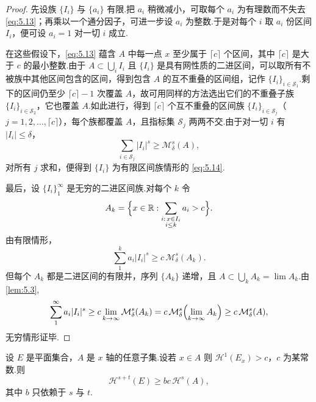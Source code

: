 \begin{proof}
先设族 $\{I_i\}$ 与 $\{a_i\}$ 有限.把 $a_i$ 稍微减小，可取每个 $a_i$ 为有理数而不失去 \eqref{eq:5.13}；再乘以一个通分因子，可进一步设 $a_i$ 为整数.于是对每个 $i$ 取 $a_i$ 份区间 $I_i$，便可设 $a_i=1$ 对一切 $i$ 成立.

在这些假设下，\eqref{eq:5.13} 蕴含 $A$ 中每一点 $x$ 至少属于 $\lceil c\rceil$ 个区间，其中 $\lceil c\rceil$ 是大于 $c$ 的最小整数.由于 $A\subset\bigcup_i I_i$ 且 $\{I_i\}$ 是具有网性质的二进区间，可以取所有不被族中其他区间包含的区间，得到包含 $A$ 的互不重叠的区间组，记作 $\{I_i\}_{i\in\mathcal{S}_1}$.剩下的区间仍至少 $\lceil c\rceil-1$ 次覆盖 $A$，故可用同样的方法选出它们的不重叠子族 $\{I_i\}_{i\in\mathcal{S}_2}$，它也覆盖 $A$.如此进行，得到 $\lceil c\rceil$ 个互不重叠的区间族 $\{I_i\}_{i\in\mathcal{S}_j}$（$j=1,2,\ldots,\lceil c\rceil$），每个族都覆盖 $A$，且指标集 $\mathcal{S}_j$ 两两不交.由于对一切 $i$ 有 $|I_i|\leq\delta$，
\[
  \sum_{i\in\mathcal{S}_j}|I_i|^{s}\geq\mathcal{M}^{s}_{\delta}(A),
\]
对所有 $j$ 求和，便得到 $\{I_i\}$ 为有限区间族情形的 \eqref{eq:5.14}.

最后，设 $\{I_i\}_{1}^{\infty}$ 是无穷的二进区间族.对每个 $k$ 令
\[
  A_k=\Bigl\{x\in\mathbb{R}:\sum_{\substack{i:\,x\in I_i\\ i\leq k}}a_i>c\Bigr\}.
\]
由有限情形，
\[
  \sum_{1}^{k}a_i|I_i|^{s}\geq c\,\mathcal{M}^{s}_{\delta}(A_k).
\]
但每个 $A_k$ 都是二进区间的有限并，序列 $\{A_k\}$ 递增，且 $A\subset\bigcup_k A_k=\lim A_k$.由\cref{lem:5.3},
\[
  \sum_{1}^{\infty}a_i|I_i|^{s}
  \geq c\lim_{k\to\infty}\mathcal{M}^{s}_{\delta}(A_k)
  =c\,\mathcal{M}^{s}_{\delta}\Bigl(\lim_{k\to\infty}A_k\Bigr)
  \geq c\,\mathcal{M}^{s}_{\delta}(A),
\]
无穷情形证毕.
\end{proof}

\begin{theorem}\label{thm:5.8}
设 $E$ 是平面集合，$A$ 是 $x$ 轴的任意子集.设若 $x\in A$ 则 $\mathcal{H}^1(E_x)>c$，$c$ 为某常数.则
\[
  \mathcal{H}^{s+t}(E)\geq bc\,\mathcal{H}^{s}(A),
\]
其中 $b$ 只依赖于 $s$ 与 $t$.
\end{theorem}

